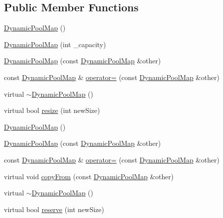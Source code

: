 \subsection*{Public Member Functions}
\begin{CompactItemize}
\item 
\hyperlink{class_j_g_t_l_1_1_dynamic_pool_map_07c6425b3ff8be9bb668c187f6431b76}{Dynamic\-Pool\-Map} ()
\item 
\hyperlink{class_j_g_t_l_1_1_dynamic_pool_map_9735fb05911155de59c894f5074d7c34}{Dynamic\-Pool\-Map} (int \_\-capacity)
\item 
\hyperlink{class_j_g_t_l_1_1_dynamic_pool_map_309ac93775245116f166ac406fc192bd}{Dynamic\-Pool\-Map} (const \hyperlink{class_j_g_t_l_1_1_dynamic_pool_map}{Dynamic\-Pool\-Map} \&other)
\item 
const \hyperlink{class_j_g_t_l_1_1_dynamic_pool_map}{Dynamic\-Pool\-Map} \& \hyperlink{class_j_g_t_l_1_1_dynamic_pool_map_36d6be1323ed844a5d93ddf9814cc059}{operator=} (const \hyperlink{class_j_g_t_l_1_1_dynamic_pool_map}{Dynamic\-Pool\-Map} \&other)
\item 
virtual \hyperlink{class_j_g_t_l_1_1_dynamic_pool_map_b833361ff8ae724639fb0d4ed9e6392f}{$\sim$Dynamic\-Pool\-Map} ()
\item 
virtual bool \hyperlink{class_j_g_t_l_1_1_dynamic_pool_map_236509cad797d15cbed5e09adf356a04}{resize} (int new\-Size)
\item 
\hyperlink{class_j_g_t_l_1_1_dynamic_pool_map_07c6425b3ff8be9bb668c187f6431b76}{Dynamic\-Pool\-Map} ()
\item 
\hyperlink{class_j_g_t_l_1_1_dynamic_pool_map_309ac93775245116f166ac406fc192bd}{Dynamic\-Pool\-Map} (const \hyperlink{class_j_g_t_l_1_1_dynamic_pool_map}{Dynamic\-Pool\-Map} \&other)
\item 
const \hyperlink{class_j_g_t_l_1_1_dynamic_pool_map}{Dynamic\-Pool\-Map} \& \hyperlink{class_j_g_t_l_1_1_dynamic_pool_map_36d6be1323ed844a5d93ddf9814cc059}{operator=} (const \hyperlink{class_j_g_t_l_1_1_dynamic_pool_map}{Dynamic\-Pool\-Map} \&other)
\item 
virtual void \hyperlink{class_j_g_t_l_1_1_dynamic_pool_map_bce0771b0a4cc6238e7e3e24f5ec3bf0}{copy\-From} (const \hyperlink{class_j_g_t_l_1_1_dynamic_pool_map}{Dynamic\-Pool\-Map} \&other)
\item 
virtual \hyperlink{class_j_g_t_l_1_1_dynamic_pool_map_b833361ff8ae724639fb0d4ed9e6392f}{$\sim$Dynamic\-Pool\-Map} ()
\item 
virtual bool \hyperlink{class_j_g_t_l_1_1_dynamic_pool_map_28192d8477398c5a94b3ca80fc366076}{reserve} (int new\-Size)
\end{CompactItemize}
